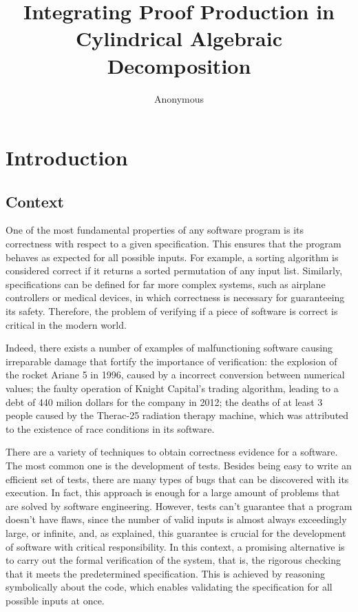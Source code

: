 \documentclass[a4paper, 12pt]{article}
\title{Integrating Proof Production in Cylindrical Algebraic Decomposition}
\author{Anonymous}
\date{}
\begin{document}
\maketitle

\vspace{-20pt}
\section{Introduction}
\subsection{Context}


\qquad One of the most fundamental properties of any software program is its correctness with respect
to a given specification. This ensures that the program behaves as expected for all possible inputs.
For example, a sorting algorithm is considered correct if it returns a sorted permutation of any input
list. Similarly, specifications can be defined for far more complex systems, such as airplane
controllers or medical devices, in which correctness is necessary for guaranteeing its safety.
Therefore, the problem of verifying if a piece of software is correct is critical in the modern world.

Indeed, there exists a number of examples of malfunctioning software causing irreparable damage
that fortify the importance of verification: the explosion of the rocket Ariane 5 in 1996, caused by
a incorrect conversion between numerical values; the faulty operation of Knight Capital's trading algorithm,
leading to a debt of 440 milion dollars for the company in 2012; the deaths of at least 3 people caused by
the Therac-25 radiation therapy machine, which was attributed to the existence of race conditions in its
software.


There are a variety of techniques to obtain correctness evidence for a
software. The most common one is the development of tests. Besides being easy to write
an efficient set of tests, there are many types of bugs that can be
discovered with its execution. In fact, this approach is enough for a large
amount of problems that are solved by software engineering.
However, tests can't guarantee that a program doesn't have flaws, since the number of
valid inputs is almost always exceedingly large, or infinite, and, as explained, this guarantee
is crucial for the development of software with critical responsibility.
In this context, a promising alternative is to carry out the formal verification
of the system, that is, the rigorous checking that it meets the predetermined specification.
This is achieved by reasoning symbolically about the code, which enables validating the specification
for all possible inputs at once.
\end{document}
